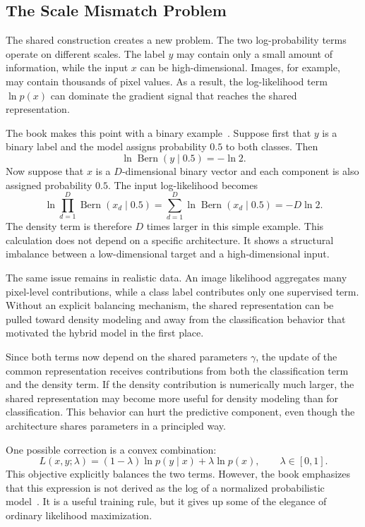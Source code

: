 \documentclass[runningheads]{llncs}
\begin{document}
\subsection{The Scale Mismatch Problem}

The shared construction creates a new problem. The two log-probability terms
operate on different scales. The label \(y\) may contain only a small amount of
information, while the input \(x\) can be high-dimensional. Images, for example,
may contain thousands of pixel values. As a result, the log-likelihood term
\(\ln p(x)\) can dominate the gradient signal that reaches the shared
representation.

The book makes this point with a binary example~\cite{tomczak2024deep}. Suppose
first that \(y\) is a binary label and the model assigns probability \(0.5\) to
both classes. Then
\[
\ln \operatorname{Bern}(y\mid 0.5)=-\ln 2.
\]
Now suppose that \(x\) is a \(D\)-dimensional binary vector and each component is
also assigned probability \(0.5\). The input log-likelihood becomes
\begin{equation*}
\ln \prod_{d=1}^{D}\operatorname{Bern}(x_d\mid 0.5)
=
\sum_{d=1}^{D}\ln \operatorname{Bern}(x_d\mid 0.5)
=
-D\ln 2.
\end{equation*}
The density term is therefore \(D\) times larger in this simple example. This
calculation does not depend on a specific architecture. It shows a structural
imbalance between a low-dimensional target and a high-dimensional input.

The same issue remains in realistic data. An image likelihood aggregates many
pixel-level contributions, while a class label contributes only one supervised
term. Without an explicit balancing mechanism, the shared representation can be
pulled toward density modeling and away from the classification behavior that
motivated the hybrid model in the first place.

Since both terms now depend on the shared parameters \(\gamma\), the update of
the common representation receives contributions from both the classification
term and the density term. If the density contribution is numerically much
larger, the shared representation may become more useful for density modeling
than for classification. This behavior can hurt the predictive component, even
though the architecture shares parameters in a principled way.

One possible correction is a convex combination:
\begin{equation}
L(x,y;\lambda)
=
(1-\lambda)\ln p(y\mid x)
+
\lambda\ln p(x),
\qquad \lambda\in[0,1].
\tag{6.8}
\label{eq:book-6-8}
\end{equation}
This objective explicitly balances the two terms. However, the book emphasizes
that this expression is not derived as the log of a normalized probabilistic
model~\cite{tomczak2024deep}. It is a useful training rule, but it gives up some
of the elegance of ordinary likelihood maximization.
\end{document}
